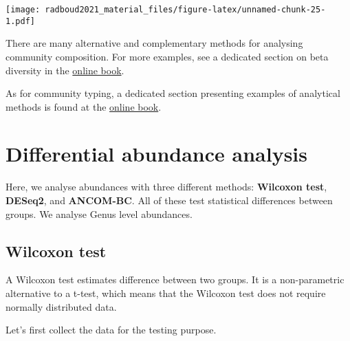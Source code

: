 \documentclass[
  oneside]{book}
\begin{document}
\texttt{[image: radboud2021\_material\_files/figure-latex/unnamed-chunk-25-1.pdf]}

There are many alternative and complementary methods for analysing
community composition. For more examples, see a dedicated section on
beta diversity in the \href{https://microbiome.github.io/OMA/}{online
book}.

As for community typing, a dedicated section presenting examples of analytical methods is found at the \href{https://microbiome.github.io/OMA/}{online
book}.

\hypertarget{differential-abundance-analysis}{%
\chapter{Differential abundance analysis}\label{differential-abundance-analysis}}

Here, we analyse abundances with three different methods: \textbf{Wilcoxon test}, \textbf{DESeq2},
and \textbf{ANCOM-BC}. All of these test statistical differences between groups.
We analyse Genus level abundances.

\hypertarget{wilcoxon-test}{%
\section{Wilcoxon test}\label{wilcoxon-test}}

A Wilcoxon test estimates difference between two groups. It is a
non-parametric alternative to a t-test, which means that the Wilcoxon test
does not require normally distributed data.

Let's first collect the data for the testing purpose.
\end{document}

